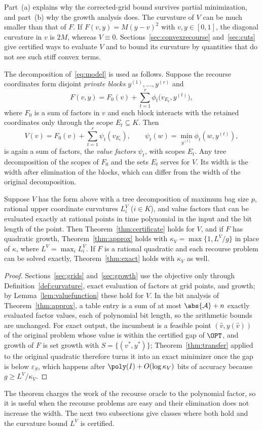 Part~(a) explains why the corrected-grid bound survives partial
minimization, and part~(b) why the growth analysis does. The curvature of
$V$ can be much smaller than that of $F$. If $F(v,y)=M(y-v)^2$ with
$v,y\in[0,1]$, the diagonal curvature in $v$ is $2M$, whereas $V\equiv0$.
Sections~\ref{sec:convexrecourse} and~\ref{sec:cuts} give certified ways to
evaluate $V$ and to bound its curvature by quantities that do not see such
stiff convex terms.

The decomposition of~\eqref{eq:model} is used as follows. Suppose the
recourse coordinates form disjoint \emph{private blocks} $y^{(1)},\dots,
y^{(r)}$ and
\begin{equation}\label{eq:privateblocks}
F(v,y)=F_0(v)+\sum_{t=1}^r\phi_t\bigl(v_{E_t},y^{(t)}\bigr),
\end{equation}
where $F_0$ is a sum of factors in $v$ and each block interacts with the
retained coordinates only through the scope $E_t\subseteq K$. Then
\[
V(v)=F_0(v)+\sum_{t=1}^r\psi_t(v_{E_t}),\qquad
\psi_t(w)=\min_{y^{(t)}}\phi_t(w,y^{(t)}),
\]
is again a sum of factors, the \emph{value factors} $\psi_t$, with scopes
$E_t$. Any tree decomposition of the scopes of $F_0$ and the sets $E_t$
serves for $V$. Its width is the width after elimination of the blocks,
which can differ from the width of the original decomposition.

\begin{theorem}\label{thm:valuefn}
Suppose $V$ has the form above with a tree decomposition of maximum bag
size $p$, rational upper coordinate curvatures $L_i^V$ ($i\in K$), and
value factors that can be evaluated exactly at rational points in time
polynomial in the input and the bit length of the point. Then
Theorem~\ref{thm:certificate} holds for $V$, and if $F$ has quadratic
growth, Theorem~\ref{thm:approx} holds with $\kappa_V=\max\{1,L^V/g\}$ in
place of $\kappa$, where $L^V=\max_iL_i^V$. If $F$ is a rational quadratic
and each recourse problem can be solved exactly, Theorem~\ref{thm:exact}
holds with $\kappa_V$ as well.
\end{theorem}

\begin{proof}
Sections~\ref{sec:grids} and~\ref{sec:growth} use the objective only
through Definition~\ref{def:curvature}, exact evaluation of factors at
grid points, and growth; by Lemma~\ref{lem:valuefunction} these hold for
$V$. In the bit analysis of Theorem~\ref{thm:approx}, a table entry is a
sum of at most $\abs{\mathcal A}+n$ exactly evaluated factor values, each of
polynomial bit length, so the arithmetic bounds are unchanged. For exact
output, the incumbent is a feasible point $(\hat v,y(\hat v))$ of the
original problem whose value is within the certified gap of $\OPT$, and
growth of $F$ is set growth with $S=\{(v^*,y^*)\}$; Theorem~\ref{thm:transfer}
applied to the original quadratic therefore turns it into an exact
minimizer once the gap is below $\varepsilon_S$, which happens after
$\poly(I)+O(\log\kappa_V)$ bits of accuracy because $g\ge L^V/\kappa_V$.
\end{proof}

The theorem charges the work of the recourse oracle to the polynomial
factor, so it is useful when the recourse problems are easy and their
elimination does not increase the width. The next two subsections give
classes where both hold and the curvature bound $L^V$ is certified.
